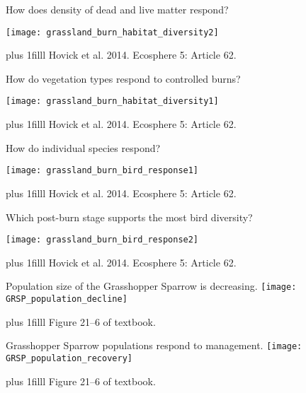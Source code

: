 \documentclass[t]{beamer}
\newcommand\imagecredit[1]{%
	\vskip0pt plus 1filll \tiny #1}%
\begin{document}
{
\begin{frame}[t,plain]{How does density of dead and live matter respond?}
	\begin{center}
		\texttt{[image: grassland\_burn\_habitat\_diversity2]}
	\end{center}

	\imagecredit{\hfill Hovick et al. 2014. Ecosphere 5: Article 62.}
\end{frame}
}

{
\begin{frame}[t,plain]{How do vegetation types respond to controlled burns?}
	\begin{center}
		\texttt{[image: grassland\_burn\_habitat\_diversity1]}
	\end{center}

	\imagecredit{\hfill Hovick et al. 2014. Ecosphere 5: Article 62.}
\end{frame}
}

{
\begin{frame}[t,plain]{How do individual species respond?}
	\begin{center}
		\texttt{[image: grassland\_burn\_bird\_response1]}
	\end{center}

	\imagecredit{\hfill Hovick et al. 2014. Ecosphere 5: Article 62.}
\end{frame}
}

{
\begin{frame}[t,plain]{Which post-burn stage supports the most bird diversity?}
	\begin{center}
		\texttt{[image: grassland\_burn\_bird\_response2]}
	\end{center}

	\imagecredit{\hfill Hovick et al. 2014. Ecosphere 5: Article 62.}
\end{frame}
}

{
\begin{frame}[t,plain]{Population size of the Grasshopper Sparrow is decreasing.}
	\centering
		\texttt{[image: GRSP\_population\_decline]}

	\imagecredit{\hfill Figure 21--6 of textbook.}
\end{frame}
}

{
\begin{frame}[t,plain]{Grasshopper Sparrow populations respond to management.}
	\centering
		\texttt{[image: GRSP\_population\_recovery]}

	\imagecredit{\hfill Figure 21--6 of textbook.}
\end{frame}
}
\end{document}
